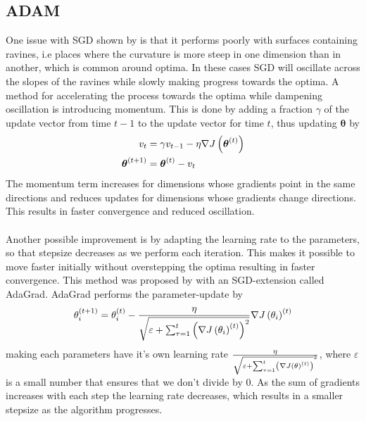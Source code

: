 \subsection{ADAM} \label{sec:ADAM}
One issue with SGD shown by \cite{sutton1986} is that it performs poorly with surfaces containing ravines, i.e places where the curvature is more steep in one dimension than in another, which is common around optima. In these cases SGD will oscillate across the slopes of the ravines while slowly making progress towards the optima. A method for accelerating the process towards the optima while dampening oscillation is introducing momentum. This is done by adding a fraction $\gamma$ of the update vector from time $t -1$ to the update vector for time $t$, thus updating $\boldsymbol{\theta}$ by
\begin{equation*}
    \begin{split}
        v_{t} &= \gamma v_{t -1} - \eta \nabla J \left (\boldsymbol{\theta}^{(t)}\right) \\
        \boldsymbol{\theta}^{(t+1)} &= \boldsymbol{\theta}^{(t)} - v_t
    \end{split}
\end{equation*}
The momentum term increases for dimensions whose gradients point in the same directions and reduces updates for dimensions whose gradients change directions. This results in faster convergence and reduced oscillation.\\
\\
Another possible improvement is by adapting the learning rate to the parameters, so that stepsize decreases as we perform each iteration. This makes it possible to move faster initially without overstepping the optima resulting in faster convergence. This method was proposed by \cite{duchi2011adaptive} with an SGD-extension called AdaGrad. AdaGrad performs the parameter-update by
\begin{equation*}
    \theta^{(t+1)}_i = \theta^{(t)}_i - \frac{\eta}{\sqrt{\varepsilon + \sum_{\tau = 1}^t \left (\nabla J \left (\theta_i\right)^{(t)}\right)^2}} \nabla J \left (\theta_i\right)^{(t)}
\end{equation*}
making each parameters have it's own learning rate $\frac{\eta}{\sqrt{\varepsilon + \sum_{\tau = 1}^t \left (\nabla J \left (\theta\right)^{(t)}\right)}^2}$, where $\varepsilon$ is a small number that ensures that we don't divide by $0$. As the sum of gradients increases with each step the learning rate decreases, which results in a smaller stepsize as the algorithm progresses.
\\
\\
